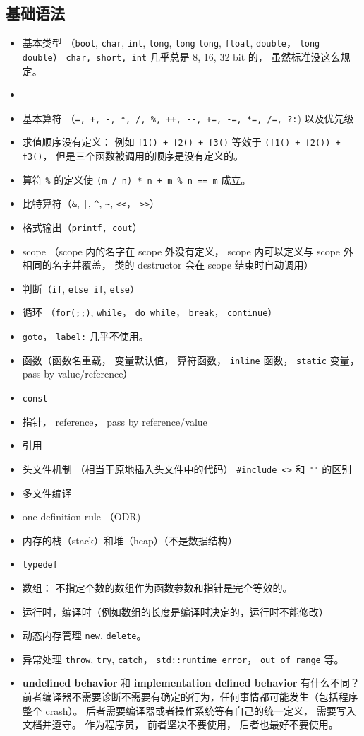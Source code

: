 \subsection{基础语法}
\begin{itemize}
\item 基本类型 （\verb`bool`, \verb`char`, \verb`int`, \verb`long`, \verb`long` \verb`long`, \verb`float`, \verb`double`， \verb`long double`） \verb`char, short, int` 几乎总是 8, 16, 32 bit 的， 虽然标准没这么规定。
\item {}
\item 基本算符 （\verb`=, +, -, *, /, %, ++, --, +=, -=, *=, /=, ?:`) 以及优先级
\item 求值顺序没有定义： 例如 \verb`f1() + f2() + f3()` 等效于 \verb`(f1() + f2()) + f3()`， 但是三个函数被调用的顺序是没有定义的。
\item 算符 \verb`%` 的定义使 \verb`(m / n) * n + m % n == m` 成立。
\item 比特算符（\verb`&`, \verb`|`, \verb`^`, \verb`~`, \verb`<<`， \verb`>>`）
\item 格式输出（\verb`printf, cout`）
\item scope （scope 内的名字在 scope 外没有定义， scope 内可以定义与 scope 外相同的名字并覆盖， 类的 destructor 会在 scope 结束时自动调用）
\item 判断（\verb`if`, \verb`else if`, \verb`else`）
\item 循环 （\verb`for(;;)`, \verb`while`， \verb`do while`， \verb`break`， \verb`continue`）
\item \verb`goto`， \verb`label:` 几乎不使用。
\item 函数（函数名重载， 变量默认值， 算符函数， \verb`inline` 函数， \verb`static` 变量，pass by value/reference）
\item \verb`const`
\item 指针， reference， pass by reference/value
\item 引用
\item 头文件机制 （相当于原地插入头文件中的代码） \verb`#include <>` 和 \verb`""` 的区别
\item 多文件编译
\item one definition rule （ODR)
\item 内存的栈（stack）和堆（heap）（不是数据结构）
\item \verb`typedef`
\item 数组： 不指定个数的数组作为函数参数和指针是完全等效的。
\item 运行时，编译时（例如数组的长度是编译时决定的，运行时不能修改）
\item 动态内存管理 \verb`new`, \verb`delete`。
\item 异常处理 \verb`throw`, \verb`try`, \verb`catch`， \verb`std::runtime_error`， \verb`out_of_range` 等。
\item \textbf{undefined behavior} 和 \textbf{implementation defined behavior} 有什么不同？ 前者编译器不需要诊断不需要有确定的行为，任何事情都可能发生（包括程序整个 crash）。 后者需要编译器或者操作系统等有自己的统一定义， 需要写入文档并遵守。 作为程序员， 前者坚决不要使用， 后者也最好不要使用。
\end{itemize}

